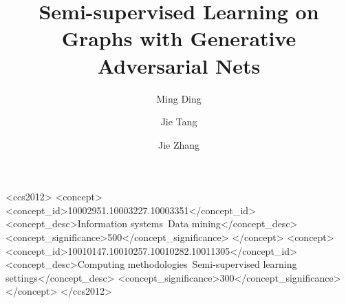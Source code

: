 \documentclass[sigconf]{acmart}
\begin{document}
\title{
Semi-supervised Learning on Graphs with Generative Adversarial Nets
}



 \author{Ming Ding}

 \author{Jie Tang}
 
 
 \author{Jie Zhang}
\renewcommand{\shortauthors}{}





%
%
\begin{CCSXML}
<ccs2012>
<concept>
<concept_id>10002951.10003227.10003351</concept_id>
<concept_desc>Information systems~Data mining</concept_desc>
<concept_significance>500</concept_significance>
</concept>
<concept>
<concept_id>10010147.10010257.10010282.10011305</concept_id>
<concept_desc>Computing methodologies~Semi-supervised learning settings</concept_desc>
<concept_significance>300</concept_significance>
</concept>
</ccs2012>
\end{CCSXML}






\maketitle








\end{document}
